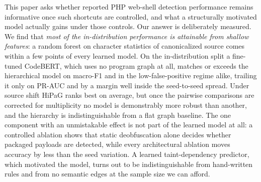 \documentclass[pdflatex,sn-mathphys-num]{sn-jnl}
\begin{document}
This paper asks whether reported PHP web-shell detection performance remains
informative once such shortcuts are controlled, and what a structurally
motivated model actually gains under those controls. Our answer is
deliberately measured. We find that \emph{most of the in-distribution
performance is attainable from shallow features}: a random forest on character
statistics of canonicalized source comes within a few points of every learned
model. On the in-distribution split a fine-tuned CodeBERT, which uses no
program graph at all, matches or exceeds the hierarchical model on macro-F1 and
in the low-false-positive regime alike, trailing it only on PR-AUC and by a
margin well inside the seed-to-seed spread. Under source shift HiPaG ranks best
on average, but once the pairwise comparisons are corrected for multiplicity no
model is demonstrably more robust than another, and the hierarchy is
indistinguishable from a flat graph baseline. The one component with an
unmistakable effect is not part of the learned model at all: a controlled
ablation shows that static deobfuscation alone decides whether packaged
payloads are detected, while every architectural ablation moves accuracy by
less than the seed variation. A learned taint-dependency predictor, which
motivated the model, turns out to be indistinguishable from hand-written rules
and from no semantic edges at the sample size we can afford.
\end{document}
